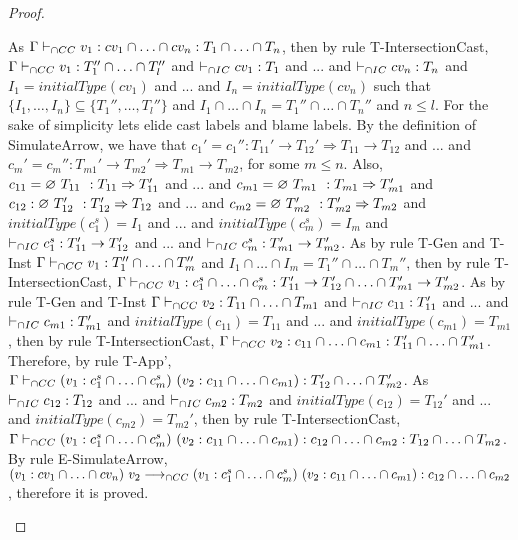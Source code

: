 \documentclass[a4paper]{article}
\begin{document}
\begin{proof}
\begin{itemize}
    As $\Gamma \vdash_{\cap CC} v_1 : cv_1 \cap \ldots \cap cv_n : T_1 \cap \ldots \cap T_n$, then by rule T-IntersectionCast, $\Gamma \vdash_{\cap CC} v_1 : T_1'' \cap \ldots \cap T_l''$ and $\vdash_{\cap IC} cv_1 : T_1$ and ... and $\vdash_{\cap IC} cv_n : T_n$ and $I_1 = initialType(cv_1)$ and ... and $I_n = initialType(cv_n)$ such that $\{I_1, \ldots, I_n\} \subseteq \{T_1'', \ldots, T_l''\}$ and $I_1 \cap \ldots \cap I_n = T_1'' \cap \ldots \cap T_n''$ and $n \leq l$.
    For the sake of simplicity lets elide cast labels and blame labels.
    By the definition of SimulateArrow, we have that $c_1' = c_1'' : T_{11}' \rightarrow T_{12}' \Rightarrow T_{11} \rightarrow T_{12}$ and ... and $c_m' = c_m'' : T_{m1}' \rightarrow T_{m2}' \Rightarrow T_{m1} \rightarrow T_{m2}$, for some $m \leq n$.
    Also, $c_{11} = \varnothing\ T_{11}\ ^{} : T_{11} \Rightarrow T_{11}'$ and ... and $c_{m1} = \varnothing\ T_{m1}\ ^{} : T_{m1} \Rightarrow T_{m1}'$ and $c_{12} : \varnothing\ T_{12}'\ ^{} : T_{12}' \Rightarrow T_{12}$ and ... and $c_{m2} = \varnothing\ T_{m2}'\ ^{} : T_{m2}' \Rightarrow T_{m2}$ and $initialType(c^s_1) = I_1$ and ... and $initialType(c^s_m) = I_m$ and $\vdash_{\cap IC} c^s_1 : T_{11}' \rightarrow T_{12}'$ and ... and $\vdash_{\cap IC} c^s_m : T_{m1}' \rightarrow T_{m2}'$.
    As by rule T-Gen and T-Inst $\Gamma \vdash_{\cap CC} v_1 : T_1'' \cap \ldots \cap T_m''$ and $I_1 \cap \ldots \cap I_m = T_1'' \cap \ldots \cap T_m''$, then by rule T-IntersectionCast, $\Gamma \vdash_{\cap CC} v_1 : c^s_1 \cap \ldots \cap c^s_m : T_{11}' \rightarrow T_{12}' \cap \ldots \cap T_{m1}' \rightarrow T_{m2}'$.
    As by rule T-Gen and T-Inst $\Gamma \vdash_{\cap CC} v_2 : T_{11} \cap \ldots \cap T_{m1}$ and $\vdash_{\cap IC} c_{11} : T_{11}'$ and ... and $\vdash_{\cap IC} c_{m1} : T_{m1}'$ and $initialType(c_{11}) = T_{11}$ and ... and $initialType(c_{m1}) = T_{m1}$, then by rule T-IntersectionCast, $\Gamma \vdash_{\cap CC} v_2 : c_{11} \cap \ldots \cap c_{m1} : T_{11}' \cap \ldots \cap T_{m1}'$.
    Therefore, by rule T-App', $\Gamma \iccts (v_1 : c^s_1 \cap \ldots \cap c^s_m)\ (v_2 : c_{11} \cap \ldots \cap c_{m1}) : T_{12}' \cap \ldots \cap T_{m2}'$.
    As $\vdash_{\cap IC} c_{12} : T_{12}$ and ... and $\vdash_{\cap IC} c_{m2} : T_{m2}$ and $initialType(c_{12}) = T_{12}'$ and ... and $initialType(c_{m2}) = T_{m2}'$, then by rule T-IntersectionCast, $\Gamma \vdash_{\cap CC} (v_1 : c^s_1 \cap \ldots \cap c^s_m)\ (v_2 : c_{11} \cap \ldots \cap c_{m1}) : c_{12} \cap \ldots \cap c_{m2} : T_{12} \cap \ldots \cap T_{m2}$.
    By rule E-SimulateArrow, $(v_1 : cv_1 \cap \ldots \cap cv_n)\ v_2 \longrightarrow_{\cap CC}\\ (v_1 : c^s_1 \cap \ldots \cap c^s_m)\ (v_2 : c_{11} \cap \ldots \cap c_{m1}) : c_{12} \cap \ldots \cap c_{m2}$, therefore it is proved.

\end{itemize}
\end{proof}
\end{document}
